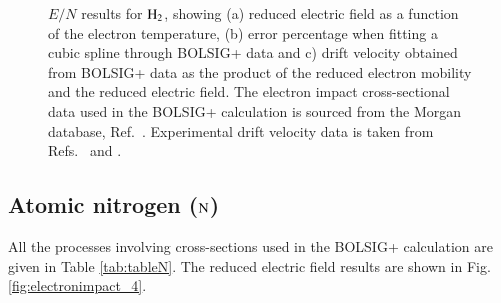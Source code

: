 \begin{figure}[!htbp]
\caption{$E/N$ results for $\rm H_2$, showing (a) reduced electric field as a function of the electron temperature, (b) error percentage when fitting a cubic spline through BOLSIG+ data and c) drift velocity obtained from BOLSIG+ data as the product of the reduced electron mobility and the reduced electric field. The electron impact cross-sectional data used in the BOLSIG+ calculation is sourced from the Morgan database, Ref.\ \cite{lxc:2024:morgan}. Experimental drift velocity data is taken from Refs.\ \cite{thesis:1965:schlumbohm} and \cite{jop:1977:saelee}.}
\label{fig:electronimpact_H2}
\end{figure}
%

%
\subsection{Atomic nitrogen ($\rm N$)}

All the processes involving cross-sections used in the BOLSIG+ calculation are given in Table \ref{tab:tableN}. The reduced electric field results are shown in Fig. \ref{fig:electronimpact_4}.

